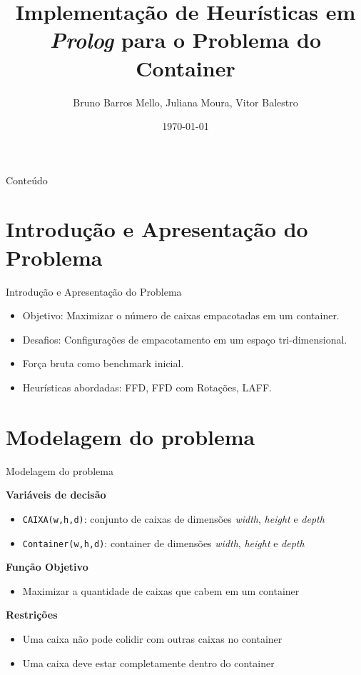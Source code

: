 \documentclass{beamer}
\title{Implementação de Heurísticas em \emph{Prolog} para o Problema do Container}
\author{Bruno Barros Mello, Juliana Moura, Vitor Balestro}
\institute{Universidade Federal Fluminense (UFF)}
\date{\today}
\begin{document}
\begin{frame}
	\titlepage
\end{frame}

\begin{frame}{Conteúdo}
	\tableofcontents
\end{frame}

\section{Introdução e Apresentação do Problema}
\begin{frame}{Introdução e Apresentação do Problema}
	\begin{itemize}
		\item Objetivo: Maximizar o número de caixas empacotadas em um container.
		\item Desafios: Configurações de empacotamento em um espaço tri-dimensional.
		\item Força bruta como benchmark inicial.
		\item Heurísticas abordadas: FFD, FFD com Rotações, LAFF.
	\end{itemize}
\end{frame}

\section{Modelagem do problema}
\begin{frame}{Modelagem do problema}

	\textbf{Variáveis de decisão}
	\begin{itemize}
		\item \texttt{CAIXA(w,h,d)}: conjunto de caixas de dimensões \emph{width}, \emph{height} e \emph{depth}
		\item \texttt{Container(w,h,d)}: container de dimensões \emph{width}, \emph{height} e \emph{depth}
	\end{itemize}

	\vspace{0.5cm}
	\textbf{Função Objetivo}
	\begin{itemize}
		\item Maximizar a quantidade de caixas que cabem em um container
	\end{itemize}

	\vspace{0.5cm}
	\textbf{Restrições}
	\begin{itemize}
		\item Uma caixa não pode colidir com outras caixas no container
		\item Uma caixa deve estar completamente dentro do container
	\end{itemize}
\end{frame}
\end{document}
